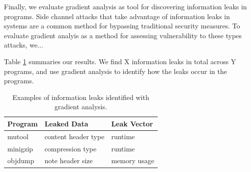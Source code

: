 Finally, we evaluate gradient analysis as tool for discovering information leaks in programs. Side channel attacks that take advantage of information leaks in systems are a common method for bypassing traditional security measures. To evaluate gradient analyis as a method for assessing vulnerability to these types attacks, we... 

Table \ref{tab:information_leaks} summaries our results. We find X information leaks in total across Y programs, and use gradient analysis to identify how the leaks occur in the programs. 


\begin{table}
\begin{tabular}{l l l}
\toprule
Program & Leaked Data & Leak Vector \\
\midrule
mutool & content header type & runtime \\
minigzip & compression type & runtime \\
objdump & note header size & memory usage \\
\bottomrule
\end{tabular}
  \caption{\label{tab:information_leaks} Examples of information leaks identified with gradient analysis. }
\end{table}
